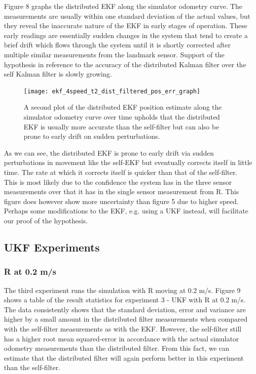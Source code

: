 \documentclass[conference]{IEEEtran} \usepackage[T1]{fontenc} \usepackage[backend=biber, style=ieee]{biblatex}
\begin{document}
Figure 8 graphs the distributed EKF along the simulator odometry curve. The measurements are usually within one standard 
deviation of the actual values, but they reveal the inaccurate nature of the EKF in early stages of operation. These early readings 
are essentially sudden changes in the system that tend to create a brief drift which flows through the system until it is shortly 
corrected after multiple similar measurements from the landmark sensor. Support of the hypothesis in reference to the accuracy 
of the distributed Kalman filter over the self Kalman filter is slowly growing.

\begin{figure}
\centering 
\texttt{[image: ekf\_4speed\_t2\_dist\_filtered\_pos\_err\_graph]}
\caption {A second plot of the distributed EKF position estimate along the simulator odometry curve over time 
upholds that the distributed EKF is usually more accurate than the self-filter but can also be prone to early drift on sudden 
perturbations.}
\label{pic8} 
\end{figure}

As we can see, the distributed EKF is prone to early drift via sudden perturbations in movement like the self-EKF but 
eventually corrects itself in little time. The rate at which it corrects itself is quicker than that of the self-filter. 
This is most likely due to the confidence the system has in the three sensor measurements over that it has in the single 
sensor measurement from R. This figure does however show more uncertainty than figure 5 due to higher speed. Perhaps some 
modifications to the EKF, e.g. using a UKF instead, will facilitate our proof of the hypothesis.

\subsection{UKF Experiments} \label{UKF Experiments}
\subsubsection{R at 0.2 m/s} \label{UKF .2}
The third experiment runs the simulation with R moving at 0.2 m/s. Figure 9 shows a table of the result statistics for experiment 3 - UKF 
with R at 0.2 m/s. The data consistently shows that the standard deviation, error and variance are higher by a small amount in 
the distributed filter measurements when compared with the self-filter measurements as with the EKF. However, 
the self-filter still has a higher root mean squared-error in accordance with the actual simulator odometry 
measurements than the distributed filter. From this fact, we can estimate that the distributed filter will 
again perform better in this experiment than the self-filter.
\end{document}
